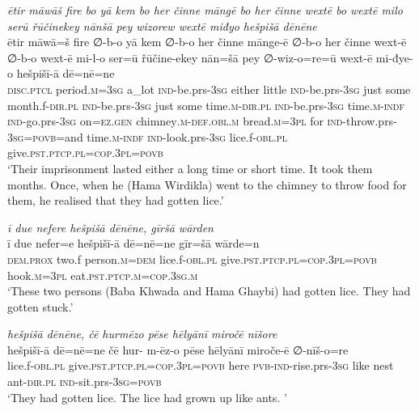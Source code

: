 \ea \label{BP.149}
\textit{ētir māwāš fire bo yā kem bo her činne māngē bo her činne wextē bo wextē milo serū řūčinekey nānšā pey wizorew wextē miđyo hešpišā dēnēne} \\ 
\gll ētir māwā=š fire ∅-b-o yā kem ∅-b-o her činne mānge-ē ∅-b-o her činne wext-ē ∅-b-o wext-ē mi-l-o ser=ū řūčine-ekey nān=šā pey ∅-wiz-o=re=ū wext-ē mi-đye-o hešpišī-ā dē=nē=ne \\ 
 \textsc{disc.ptcl} period\textsc{.m}\textsc{=3sg} a\_lot \textsc{ind-}be.prs\textsc{-3sg} either little \textsc{ind-}be.prs\textsc{-3sg} just some month.f\textsc{-dir}\textsc{.pl} \textsc{ind-}be.prs\textsc{-3sg} just some time\textsc{.m}\textsc{-dir}\textsc{.pl} \textsc{ind-}be.prs\textsc{-3sg} time\textsc{.m}\textsc{-indf} \textsc{ind-}go.prs\textsc{-3sg} on\textsc{=ez.gen} chimney\textsc{.m}\textsc{-def}\textsc{.obl}\textsc{.m} bread\textsc{.m}\textsc{=3pl} for \textsc{ind-}throw.prs\textsc{-3sg}\textsc{=\textsc{povb}}=and time\textsc{.m}\textsc{-indf} \textsc{ind-}look.prs\textsc{-3sg} lice.f\textsc{-obl}\textsc{.pl} give\textsc{.pst}\textsc{.ptcp}\textsc{.pl}\textsc{=cop}\textsc{.3pl}\textsc{=\textsc{povb}} \\ 
\glt `Their imprisonment lasted either a long time or short time. It took them months. Once, when he (Hama Wirdikla) went to the chimney to throw food for them, he realised that they had gotten lice.'
\z 
 
\ea \label{BP.150}
\textit{ī due nefere hešpišā dēnēne, gīršā wārden} \\ 
\gll ī due nefer=e hešpišī-ā dē=nē=ne gīr=šā wārde=n \\ 
 \textsc{dem.prox} two.f person\textsc{.m}\textsc{=dem} lice.f\textsc{-obl}\textsc{.pl} give\textsc{.pst}\textsc{.ptcp}\textsc{.pl}\textsc{=cop}\textsc{.3pl}\textsc{=\textsc{povb}} hook\textsc{.m}\textsc{=3pl} eat\textsc{.pst}\textsc{.ptcp}\textsc{.m}\textsc{=cop}\textsc{.3sg}\textsc{.m} \\ 
\glt `These two persons (Baba Khwada and Hama Ghaybi) had gotten lice. They had gotten stuck.'
\z 
 
\ea \label{BP.151}
\textit{hešpišā dēnēne, čē hurmēzo pēse hēlyānī miročē nīšore} \\ 
\gll hešpišī-ā dē=nē=ne čē hur- m-ēz-o pēse hēlyānī miroče-ē ∅-nīš-o=re \\ 
 lice.f\textsc{-obl}\textsc{.pl} give\textsc{.pst}\textsc{.ptcp}\textsc{.pl}\textsc{=cop}\textsc{.3pl}\textsc{=\textsc{povb}} here \textsc{pvb-}\textsc{ind-}rise.prs\textsc{-3sg} like nest ant\textsc{-dir}\textsc{.pl} \textsc{ind-}sit.prs\textsc{-3sg}\textsc{=\textsc{povb}} \\ 
\glt `They had gotten lice. The lice had grown up like ants. '
\z 
 
